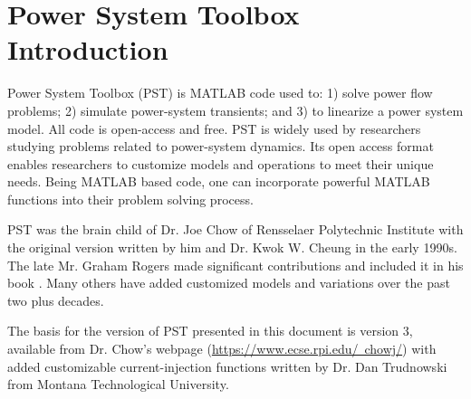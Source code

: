 \vspace{2em} %
\chapter*{Power System Toolbox Introduction}


Power System Toolbox (PST) is MATLAB code used to: 1) solve power flow problems; 2) simulate power-system transients; and 3) to linearize a power system model.  
All code is open-access and free.  
PST is widely used by researchers studying problems related to power-system dynamics.  
Its open access format enables researchers to customize models and operations to meet their unique needs.  
Being MATLAB based code, one can incorporate powerful MATLAB functions into their problem solving process.

\vspace{1em}
PST was the brain child of Dr. Joe Chow of Rensselaer Polytechnic Institute with the original version written by him and Dr. Kwok W. Cheung in the early 1990s.  
The late Mr. Graham Rogers made significant contributions and included it in his book \cite{rogers1999}.  
Many others have added customized models and variations over the past two plus decades. 

\vspace{1em}
The basis for the version of PST presented in this document is version 3, available from Dr. Chow’s webpage (\href{https://www.ecse.rpi.edu/~chowj/}{https://www.ecse.rpi.edu/~chowj/}) with added customizable current-injection functions written by Dr. Dan Trudnowski from Montana Technological University.